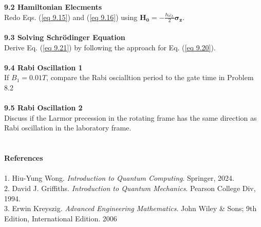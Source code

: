 \documentclass{article}
\begin{document}
\textbf{9.2 Hamiltonian Elecments}\\
Redo Eqs. (\ref{eq 9.15}) and (\ref{eq 9.16}) using $\boldsymbol{H_0}=-\frac{\hbar\omega_L}{2}\boldsymbol{\sigma_z}$.\\\\
\textbf{9.3 Solving Schr\"{o}dinger Equation}\\
Derive Eq. (\ref{eq 9.21}) by following the approach for Eq. (\ref{eq 9.20}).\\\\
\textbf{9.4 Rabi Oscillation 1}\\
If $B_1=0.01 T$, compare the Rabi oscialltion period to the gate time in Problem 8.2\\\\
\textbf{9.5 Rabi Oscillation 2}\\
Discuss if the Larmor precession in the rotating frame has the same direction as Rabi oscillation in the laboratory frame.\\\\\\
\textbf{\large References}\\\\
1. Hiu-Yung Wong. \textit{Introduction to Quantum Computing}. Springer, 2024.\\
2. David J. Griffiths. \textit{Introduction to Quantum Mechanics}. Pearson College Div, 1994.\\
3. Erwin Kreyszig. \textit{Advanced Engineering Mathematics}. John Wiley \& Sons; 9th Edition, International Edition. 2006
\end{document}
